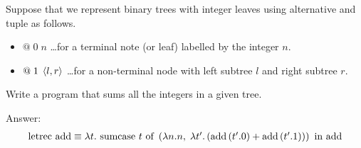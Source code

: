 \begin{enumcirc}
	Suppose that we represent binary trees with integer leaves using alternative
	and tuple as follows.
	\begin{itemize}
		\item
		      $@ \; 0 \; n$ \dots for a terminal note (or leaf) labelled by the integer $n$.
		\item
		      $@ \; 1 \; \left\langle l, r \right\rangle$ \dots for a non-terminal node with left subtree $l$ and right subtree $r$.
	\end{itemize}
	Write a program that sums all the integers in a given tree.

	Answer:
	\[
		\begin{array}{l}
			\textrm{letrec } \textrm{add} \equiv \lambda t . 
				\textrm{ sumcase } t \textrm{ of } \left( 
					\lambda n . n,\;
					\lambda t' . \left( \textrm{add} \left( t' . 0 \right) + \textrm{add} \left( t' . 1 \right) \right)
				 \right)
			 \textrm{ in } \textrm{add}
		\end{array}
	\]
\end{enumcirc}


